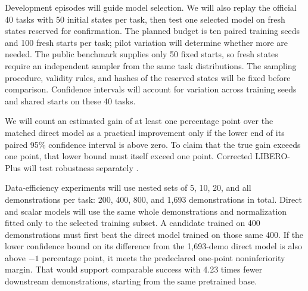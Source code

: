 Development episodes will guide model selection. We will also replay the official 40 tasks with 50 initial states per task, then test one selected model on fresh states reserved for confirmation. The planned budget is ten paired training seeds and 100 fresh starts per task; pilot variation will determine whether more are needed. The public benchmark supplies only 50 fixed starts, so fresh states require an independent sampler from the same task distributions. The sampling procedure, validity rules, and hashes of the reserved states will be fixed before comparison. Confidence intervals will account for variation across training seeds and shared starts on these 40 tasks.

We will count an estimated gain of at least one percentage point over the matched direct model as a practical improvement only if the lower end of its paired 95\% confidence interval is above zero. To claim that the true gain exceeds one point, that lower bound must itself exceed one point. Corrected LIBERO-Plus will test robustness separately \cite{liberoplus,lajepa}.

Data-efficiency experiments will use nested sets of 5, 10, 20, and all demonstrations per task: 200, 400, 800, and 1,693 demonstrations in total. Direct and scalar models will use the same whole demonstrations and normalization fitted only to the selected training subset. A candidate trained on 400 demonstrations must first beat the direct model trained on those same 400. If the lower confidence bound on its difference from the 1,693-demo direct model is also above $-1$ percentage point, it meets the predeclared one-point noninferiority margin. That would support comparable success with 4.23 times fewer downstream demonstrations, starting from the same pretrained base.
